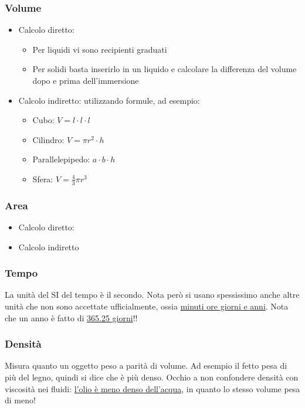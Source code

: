 \subsubsection{Volume}
\begin{itemize}
	\item Calcolo diretto:
	      \begin{itemize}
		      \item Per liquidi vi sono recipienti graduati
		      \item Per solidi basta inserirlo in un liquido e calcolare la differenza del volume dopo e prima dell'immersione
	      \end{itemize}
	\item Calcolo indiretto: utilizzando formule, ad esempio:
	      \begin{itemize}
		      \item Cubo: $ V = l \cdot l \cdot l $
		      \item Cilindro: $ V = \pi r^2  \cdot h $
		      \item Parallelepipedo: $ a \cdot b \cdot h $
		      \item Sfera: $ V = \frac{4}{3}\pi r^3  $
	      \end{itemize}
\end{itemize}
\subsubsection{Area}
\begin{itemize}
	\item Calcolo diretto:
	\item Calcolo indiretto
\end{itemize}
\subsubsection{Tempo}
La unità del SI del tempo è il secondo. Nota però si usano spessissimo anche altre unità che non sono accettate ufficialmente, ossia \underline{minuti ore giorni e anni}. Nota che un anno è fatto di \underline{365.25 giorni}!!
\subsubsection{Densità}
Misura quanto un oggetto peso a parità di volume. Ad esempio il fetto pesa di più del legno, quindi si dice che è più denso. Occhio a non confondere densità con viscosità nei fluidi: \underline{l'olio è meno denso dell'acqua}, in quanto lo stesso volume pesa di meno!
